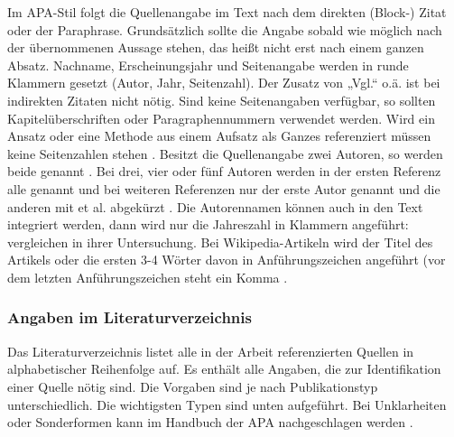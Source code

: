 Im APA-Stil folgt die Quellenangabe im Text nach dem direkten (Block-) Zitat oder der Paraphrase. Grundsätzlich sollte die Angabe sobald wie möglich nach der übernommenen Aussage stehen, das heißt nicht erst nach einem ganzen Absatz. Nachname, Erscheinungsjahr und Seitenangabe werden in runde Klammern gesetzt (Autor, Jahr, Seitenzahl). Der Zusatz von „Vgl.“ o.ä. ist bei indirekten Zitaten nicht nötig. Sind keine Seitenangaben verfügbar, so sollten Kapitelüberschriften oder Paragraphennummern verwendet werden. Wird ein Ansatz oder eine Methode aus einem Aufsatz als Ganzes referenziert müssen keine Seitenzahlen stehen \cite{mustermann2013test}. Besitzt die Quellenangabe zwei Autoren, so werden beide genannt \cite{mustermann2015gemeinsam}. Bei drei, vier oder fünf Autoren werden in der ersten Referenz alle genannt \cite*{mustermann2017viele} und bei weiteren Referenzen nur der erste Autor genannt und die anderen mit et al. abgekürzt \cite{mustermann2017viele}. Die Autorennamen können auch in den Text integriert werden, dann wird nur die Jahreszahl in Klammern angeführt: \citet{mustermann2013test} vergleichen in ihrer Untersuchung. Bei Wikipedia-Artikeln wird der Titel des Artikels oder die ersten 3-4 Wörter davon in Anführungszeichen angeführt (vor dem letzten Anführungszeichen steht ein Komma \cite{noauthor_wissenschaft_2020}.

\subsubsection{Angaben im Literaturverzeichnis}\label{subsubsec:angaben}

Das Literaturverzeichnis listet alle in der Arbeit referenzierten Quellen in alphabetischer Reihenfolge auf. Es enthält alle Angaben, die zur Identifikation einer Quelle nötig sind. Die Vorgaben sind je nach Publikationstyp unterschiedlich. Die wichtigsten Typen sind unten aufgeführt. Bei Unklarheiten oder Sonderformen kann im Handbuch der APA nachgeschlagen werden \cite{american2010concise}.


\makeatletter 
\renewcommand\BR@b@bibitem[2][]{\BR@bibitem[#1]{#2}\BR@c@bibitem{#2}}           
\makeatother

\nobibliography*%


